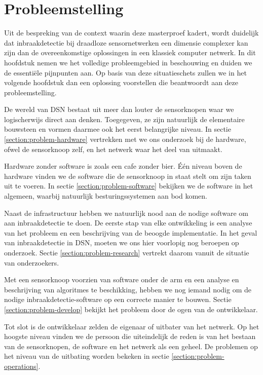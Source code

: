 
\chapter{Probleemstelling}
\label{chapter:probleemstelling}

Uit de bespreking van de context waarin deze masterproef kadert, wordt duidelijk dat
inbraakdetectie bij draadloze sensornetwerken een dimensie complexer kan zijn
dan de overeenkomstige oplossingen in een klassiek computer netwerk. In dit
hoofdstuk nemen we het volledige probleemgebied in beschouwing en duiden we de
essenti\"ele pijnpunten aan. Op basis van deze situatieschets zullen we in het
volgende hoofdstuk dan een oplossing voorstellen die beantwoordt aan deze
probleemstelling.

De wereld van DSN bestaat uit meer dan louter de sensorknopen waar we
logischerwijs direct aan denken. Toegegeven, ze zijn natuurlijk de elementaire
bouwsteen en vormen daarmee ook het eerst belangrijke niveau. In sectie
\ref{section:problem-hardware} vertrekken met we ons onderzoek bij de hardware,
ofwel de sensorknoop zelf, en het netwerk waar het deel van uitmaakt.

Hardware zonder software is zoals een cafe zonder bier. \'E\'en niveau boven de
hardware vinden we de software die de sensorknoop in staat stelt om zijn taken
uit te voeren. In sectie \ref{section:problem-software} bekijken we de software
in het algemeen, waarbij natuurlijk besturingssystemen aan bod komen.

Naast de infrastructuur hebben we natuurlijk nood aan de nodige software om aan
inbraakdetectie te doen. De eerste stap van elke ontwikkeling is een analyse
van het probleem en een beschrijving van de beoogde implementatie. In het geval
van inbraakdetectie in DSN, moeten we ons hier voorlopig nog beroepen op
onderzoek. Sectie \ref{section:problem-research} vertrekt daarom vanuit de
situatie van onderzoekers.

Met een sensorknoop voorzien van software onder de arm en een analyse en
beschrijving van algoritmes te beschikking, hebben we nog iemand nodig om de
nodige inbraakdetectie-software op een correcte manier te bouwen. Sectie
\ref{section:problem-develop} bekijkt het probleem door de ogen van de
ontwikkelaar.

Tot slot is de ontwikkelaar zelden de eigenaar of uitbater van het netwerk. Op
het hoogste niveau vinden we de persoon die uiteindelijk de reden is van het
bestaan van de sensorknopen, de software en het netwerk als een geheel. De
problemen op het niveau van de uitbating worden bekeken in sectie
\ref{section:problem-operations}.

